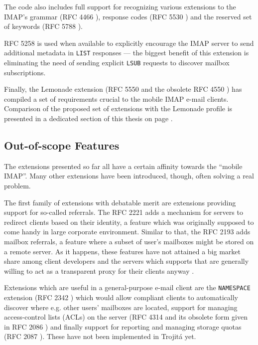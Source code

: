 \documentclass[trojita]{subfiles}
\begin{document}
The code also includes full support for recognizing various extensions to the IMAP's grammar (RFC 4466 \cite{rfc4466}),
response codes (RFC 5530 \cite{rfc5530}) and the reserved set of keywords (RFC 5788 \cite{rfc5788}).

RFC 5258 \cite{rfc5258} is used when available to explicitly encourage the IMAP server to send additional metadata in
{\tt LIST} responses --- the biggest benefit of this extension is eliminating the need of sending explicit {\tt LSUB}
requests to discover mailbox subscriptions.

Finally, the Lemonade extension (RFC 5550 \cite{rfc5550} and the obsolete RFC 4550 \cite{rfc4550}) has compiled a set of
requirements crucial to the mobile IMAP e-mail clients.  Comparison of the proposed set of extensions with the Lemonade
profile is presented in a dedicated section of this thesis on page \pageref{sec:lemonade-comparison}.

\subsection{Out-of-scope Features}

The extensions presented so far all have a certain affinity towards the ``mobile IMAP''.  Many other extensions have
been introduced, though, often solving a real problem.

The first family of extensions with debatable merit are extensions providing support for so-called referrals.  The RFC
2221 \cite{rfc2221} adds a mechanism for servers to redirect clients based on their identity, a feature which was
originally supposed to come handy in large corporate environment.  Similar to that, the RFC 2193 \cite{rfc2193} adds
mailbox referrals, a feature where a subset of user's mailboxes might be stored on a remote server.  As it happens,
these features have not attained a big market share among client developers \cite{thunderbird-referrals} and the servers
which supports that are generally willing to act as a transparent proxy for their clients anyway
\cite{cyrus-referral-proxy}.

Extensions which are useful in a general-purpose e-mail client are the {\tt NAMESPACE} extension (RFC 2342
\cite{rfc2342}) which would allow compliant clients to automatically discover where e.g. other users' mailboxes are
located, support for managing access-control lists (ACLs) on the server (RFC 4314 \cite{rfc4314} and its obsolete form
given in RFC 2086 \cite{rfc2086}) and finally support for reporting and managing storage quotas (RFC 2087
\cite{rfc2087}).  These have not been implemented in Trojitá yet.
\end{document}
